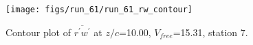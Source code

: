 \begin{figure}[H]
\centering
\texttt{[image: figs/run\_61/run\_61\_rw\_contour]}
\caption{Contour plot of $\overline{r^\prime w^\prime}$ at $z/c$=10.00, $V_{free}$=15.31, station 7.}
\label{fig:run_61_rw_contour}
\end{figure}


